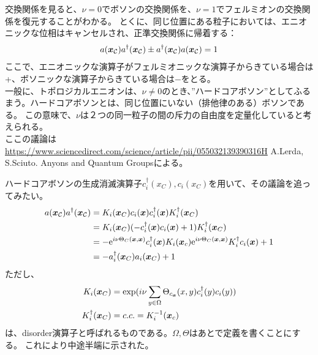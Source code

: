 \documentclass[a4paper,11pt]{jsarticle}
\begin{document}
交換関係を見ると、$\nu=0$でボソンの交換関係を、$\nu=1$でフェルミオンの交換関係を復元することがわかる。
とくに、同じ位置にある粒子においては、エニオニックな位相はキャンセルされ、正準交換関係に帰着する：
\begin{align}
  a(\vb*{x}_\mathcal{C})a^{\dag}(\vb*{x}_\mathcal{C})\pm a^{\dag}(\vb*{x}_\mathcal{C})a(\vb*{x}_\mathcal{C})=1\\
\end{align}
ここで、エニオニックな演算子がフェルミオニックな演算子からきている場合は+、ボソニックな演算子からきている場合は$-$をとる。\\
一般に、トポロジカルエニオンは、$\nu\neq0$のとき、”ハードコアボソン”としてふるまう。ハードコアボソンとは、同じ位置にいない（排他律のある）ボソンである。
この意味で、$\nu$は２つの同一粒子の間の斥力の自由度を定量化していると考えられる。\\
ここの議論は\url{https://www.sciencedirect.com/science/article/pii/055032139390316H}{ A.Lerda, S.Sciuto. Anyons and Quantum Groups}による。

ハードコアボソンの生成消滅演算子$c_i^{\dag}(x_C),c_i(x_C)$を用いて、その議論を追ってみたい。
\begin{align}
  a(\vb*{x}_\mathcal{C})a^{\dag}(\vb*{x}_\mathcal{C})&=K_i(\vb*{x}_C)c_i(\vb*{x})c_i^{\dag}(\vb*{x})K_i^{\dag}(\vb*{x}_C)\\
  &=K_i(\vb*{x}_C)(-c_i^{\dag}(\vb*{x})c_i(\vb*{x})+1)K_i^{\dag}(\vb*{x}_C)\\
  &=-\mathrm{e}^{i\nu\Theta_C(\vb*{x},\vb*{x})}c_i^{\dag}(\vb*{x})K_i(\vb*{x}_c)\mathrm{e}^{i\nu\Theta_C(\vb*{x},\vb*{x})}K_i^{\dag}c_i(\vb*{x})+1\\
  &=-a_i^{\dag}(\vb*{x}_C)a_i(\vb*{x}_C)+1
\end{align}
ただし、
\begin{align}
 K_i(\vb*{x}_C)&=\mathrm{exp}(i\nu\sum_{y\in\Omega}\Theta_{c_{\vb*{x}}}(x,y)c_i^{\dag}(y)c_i(y))\\
K_i^{\dag}(\vb*{x}_C)&=c.c.=K_i^{-1}(\vb*{x}_c)
\end{align}
は、disorder演算子と呼ばれるものである。$\Omega,\Theta$はあとで定義を書くことにする。
これにより中途半端に示された。
\end{document}
